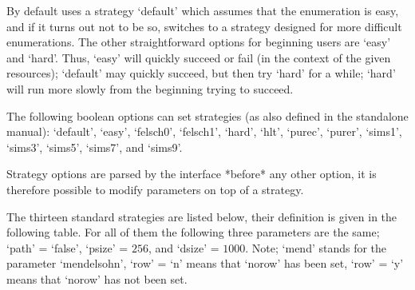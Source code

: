 By default  {\ACE} uses  a strategy `default'  which assumes  that the
enumeration is easy, and if it turns out not to be so, {\ACE} switches
to  a strategy designed  for more  difficult enumerations.   The other
straightforward  options for  beginning users  are `easy'  and `hard'.
Thus, `easy' will quickly succeed or fail (in the context of the given
resources); `default' may  quickly succeed, but then try  `hard' for a
while;  `hard' will  run  more  slowly from  the  beginning trying  to
succeed.

The following boolean  options can set strategies (as  also defined in
the   {\ACE}  standalone   manual):   `default',  `easy',   `felsch0',
`felsch1', `hard', `hlt', `purec', `purer', `sims1', `sims3', `sims5',
`sims7', and `sims9'.

Strategy  options  are parsed  by  the  interface  *before* any  other
option,  it is therefore  possible to  modify parameters  on top  of a
strategy.

The thirteen standard strategies are listed below, their definition is
given  in the following  table. For  all of  them the  following three
parameters  are the  same;  `path'  = `false',  `psize'  = $256$,  and
`dsize' = $1000$. Note;  `mend' stands for the parameter `mendelsohn',
`row' =  `n' means that `norow' has  been set, `row' =  `y' means that
`norow' has not been set.

